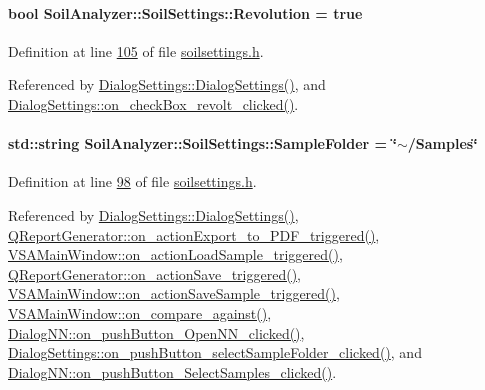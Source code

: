 \paragraph[{Revolution}]{\setlength{\rightskip}{0pt plus 5cm}bool Soil\+Analyzer\+::\+Soil\+Settings\+::\+Revolution = true}\label{class_soil_analyzer_1_1_soil_settings_a72cdc805222bbb57772cb3d9bba7555a}


Definition at line \hyperlink{soilsettings_8h_source_l00105}{105} of file \hyperlink{soilsettings_8h_source}{soilsettings.\+h}.



Referenced by \hyperlink{dialogsettings_8cpp_source_l00005}{Dialog\+Settings\+::\+Dialog\+Settings()}, and \hyperlink{dialogsettings_8cpp_source_l00519}{Dialog\+Settings\+::on\+\_\+check\+Box\+\_\+revolt\+\_\+clicked()}.

\hypertarget{class_soil_analyzer_1_1_soil_settings_adfd46a349d927988c955fa064fc7bf1a}{}
\paragraph[{Sample\+Folder}]{\setlength{\rightskip}{0pt plus 5cm}std\+::string Soil\+Analyzer\+::\+Soil\+Settings\+::\+Sample\+Folder = \char`\"{}$\sim$/Samples\char`\"{}}\label{class_soil_analyzer_1_1_soil_settings_adfd46a349d927988c955fa064fc7bf1a}


Definition at line \hyperlink{soilsettings_8h_source_l00098}{98} of file \hyperlink{soilsettings_8h_source}{soilsettings.\+h}.



Referenced by \hyperlink{dialogsettings_8cpp_source_l00005}{Dialog\+Settings\+::\+Dialog\+Settings()}, \hyperlink{qreportgenerator_8cpp_source_l00416}{Q\+Report\+Generator\+::on\+\_\+action\+Export\+\_\+to\+\_\+\+P\+D\+F\+\_\+triggered()}, \hyperlink{vsamainwindow_8cpp_source_l00475}{V\+S\+A\+Main\+Window\+::on\+\_\+action\+Load\+Sample\+\_\+triggered()}, \hyperlink{qreportgenerator_8cpp_source_l00401}{Q\+Report\+Generator\+::on\+\_\+action\+Save\+\_\+triggered()}, \hyperlink{vsamainwindow_8cpp_source_l00460}{V\+S\+A\+Main\+Window\+::on\+\_\+action\+Save\+Sample\+\_\+triggered()}, \hyperlink{vsamainwindow_8cpp_source_l00570}{V\+S\+A\+Main\+Window\+::on\+\_\+compare\+\_\+against()}, \hyperlink{dialognn_8cpp_source_l00130}{Dialog\+N\+N\+::on\+\_\+push\+Button\+\_\+\+Open\+N\+N\+\_\+clicked()}, \hyperlink{dialogsettings_8cpp_source_l00465}{Dialog\+Settings\+::on\+\_\+push\+Button\+\_\+select\+Sample\+Folder\+\_\+clicked()}, and \hyperlink{dialognn_8cpp_source_l00075}{Dialog\+N\+N\+::on\+\_\+push\+Button\+\_\+\+Select\+Samples\+\_\+clicked()}.

